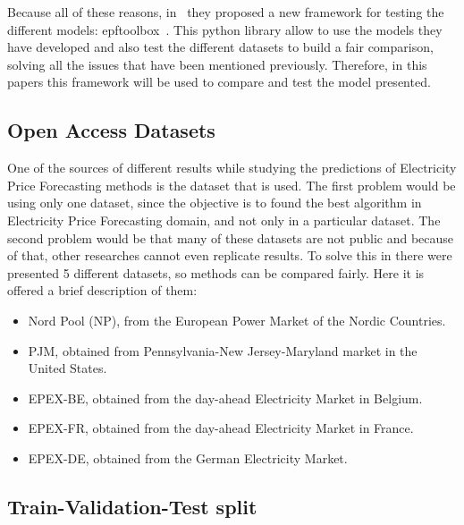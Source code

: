 \documentclass[journal]{IEEEtran}
\begin{document}
Because all of these reasons, in~\cite{lagoForecastingDayaheadElectricity2021} they proposed a new framework for testing the different models: epftoolbox~\cite{WelcomeEpftoolboxDocumentation}. This python library allow to use the models they have developed and also test the different datasets to build a fair comparison, solving all the issues that have been mentioned previously. Therefore, in this papers this framework will be used to compare and test the model presented.

\subsection{Open Access Datasets}

One of the sources of different results while studying the predictions of Electricity Price Forecasting methods is the dataset that is used. The first problem would be using only one dataset, since the objective is to found the best algorithm in Electricity Price Forecasting domain, and not only in a particular dataset. The second problem would be that many of these datasets are not public and because of that, other researches cannot even replicate results. To solve this in \cite{lagoForecastingDayaheadElectricity2021} there were presented 5 different datasets, so methods can be compared fairly. Here it is offered a brief description of them:
\begin{itemize}
    \item Nord Pool (NP), from the European Power Market of the Nordic Countries.
    \item PJM, obtained from Pennsylvania-New Jersey-Maryland market in the United States.
    \item EPEX-BE, obtained from the day-ahead Electricity Market in Belgium.
    \item EPEX-FR, obtained from the day-ahead Electricity Market in France.
    \item EPEX-DE, obtained from the German Electricity Market. 
\end{itemize}

\subsection{Train-Validation-Test split}
\end{document}
